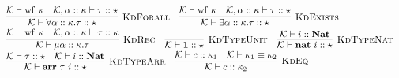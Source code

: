 \documentclass[fleqn]{article}
\begin{document}
\[\begin{array}{l}
    \infer[\textsc{KdForall}]{\mathcal{K} \vdash \forall \alpha :: \kappa. \tau :: \star}{\mathcal{K} \vdash \mathrm{wf}~\kappa & \mathcal{K},\alpha :: \kappa \vdash \tau :: \star} \hspace{1em}
    \infer[\textsc{KdExists}]{\mathcal{K} \vdash \exists \alpha :: \kappa. \tau :: \star}{\mathcal{K} \vdash \mathrm{wf}~\kappa & \mathcal{K},\alpha :: \kappa \vdash \tau :: \star} \\
    \infer[\textsc{KdRec}]{\mathcal{K} \vdash \mu \alpha :: \kappa. \tau}{\mathcal{K} \vdash \mathrm{wf}~\kappa & \mathcal{K},\alpha :: \kappa \vdash \tau :: \kappa} \hspace{1em}
    \infer[\textsc{KdTypeUnit}]{\mathcal{K} \vdash \mathbf{1} :: \star}{} \hspace{1em}
    \infer[\textsc{KdTypeNat}]{\mathcal{K} \vdash \mathbf{nat}~i :: \star}{\mathcal{K} \vdash i :: \mathbf{Nat}} \\
    \infer[\textsc{KdTypeArr}]{\mathcal{K} \vdash \mathbf{arr}~\tau~i :: \star}{\mathcal{K} \vdash \tau :: \star & \mathcal{K} \vdash i :: \mathbf{Nat}} \hspace{1em}
    \infer[\textsc{KdEq}]{\mathcal{K} \vdash c :: \kappa_2}{\mathcal{K} \vdash c :: \kappa_1 & \mathcal{K} \vdash \kappa_1 \equiv \kappa_2}
\end{array}
\]
\end{document}
